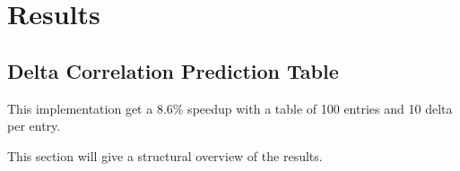 \chapter{Results}
\section{Delta Correlation Prediction Table}
This implementation get a 8.6\% speedup with a table of 100 entries and 10 delta per entry.

This section will give a structural overview of the results.

